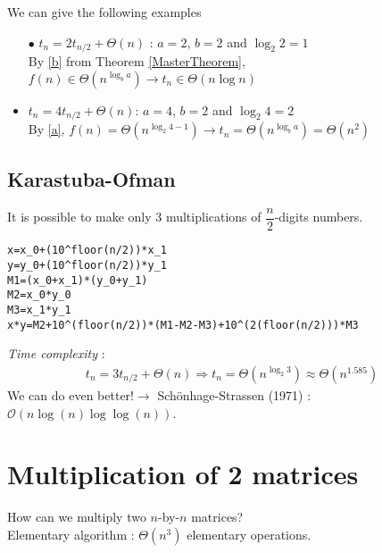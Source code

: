 \begin{example}
\begin{leftbar}
We can give the following examples
\begin{itemize}
\item[$\bullet$] $t_n=2t_{n/2}+\Theta(n)$ : $a=2$, $b=2$ and $\log_2 2=1$\\
By \ref{b} from Theorem \ref{MasterTheorem}, $f(n)\in \Theta\left(n^{\log_ba}\right)\rightarrow t_n \in \Theta(n\log n)$
\item $t_n=4t_{n/2}+\Theta(n)$: $a=4$, $b=2$ and $\log_2 4=2$\\
By \ref{a}, $f(n)=\Theta\left(n^{\log_2 4-1}\right)\rightarrow t_n=\Theta\left(n^{\log_ba}\right)=\Theta\left(n^2\right)$
\end{itemize}
\end{leftbar}
\end{example}


\subsection{Karastuba-Ofman}

It is possible to make only 3 multiplications of $\dfrac{n}{2}$-digits numbers.

\begin{lstlisting}[label={list:c3:Multiply(x,y)},caption=\texttt{Multiply(x,y)} \textmd{(Karastuba-Ofman, 1962)}]
x=x_0+(10^floor(n/2))*x_1
y=y_0+(10^floor(n/2))*y_1
M1=(x_0+x_1)*(y_0+y_1)
M2=x_0*y_0
M3=x_1*y_1
x*y=M2+10^(floor(n/2))*(M1-M2-M3)+10^(2(floor(n/2)))*M3
\end{lstlisting}


\emph{Time complexity} : 
\begin{align*}
t_n=3t_{n/2}+\Theta (n) \Rightarrow t_n=\Theta\left(n^{\log_2 3}\right)\approx \Theta\left(n^{1.585}\right)
\end{align*}
We can do even better!$\rightarrow$ Schönhage-Strassen (1971) : $\mathcal{O}(n\log(n)\log\log(n))$.

\section{Multiplication of 2 matrices}

How can we multiply two $n$-by-$n$ matrices?\\
Elementary algorithm : $\Theta(n^3)$ elementary operations.

